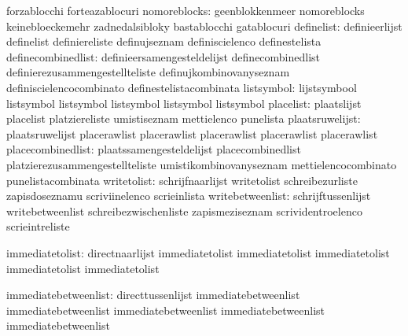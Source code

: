                                   forzablocchi                     forteazablocuri
                   nomoreblocks:  geenblokkenmeer                  nomoreblocks
                                  keinebloeckemehr                 zadnedalsibloky
                                  bastablocchi                     gatablocuri
                     definelist:  definieerlijst                   definelist
                                  definiereliste                   definujseznam
                                  definiscielenco                  definestelista
             definecombinedlist:  definieersamengesteldelijst      definecombinedlist
                                  definierezusammengestellteliste  definujkombinovanyseznam
                                  definiscielencocombinato         definestelistacombinata
listsymbol: lijstsymbool listsymbol
            listsymbol   listsymbol
            listsymbol   listsymbol
                      placelist:  plaatslijst                      placelist
                                  platziereliste                   umistiseznam
                                  mettielenco                      punelista
                plaatsruwelijst:  plaatsruwelijst                  placerawlist
                                  placerawlist                     placerawlist
                                  placerawlist                     placerawlist
              placecombinedlist:  plaatssamengesteldelijst         placecombinedlist
                                  platzierezusammengestellteliste  umistikombinovanyseznam
                                  mettielencocombinato             punelistacombinata
                    writetolist:  schrijfnaarlijst                 writetolist
                                  schreibezurliste                 zapisdoseznamu
                                  scriviinelenco                   scrieinlista
               writebetweenlist:  schrijftussenlijst               writebetweenlist
                                  schreibezwischenliste            zapismeziseznam
                                  scrividentroelenco               scrieintreliste


                 immediatetolist: directnaarlijst                  immediatetolist
                                  immediatetolist                  immediatetolist
                                  immediatetolist                  immediatetolist

            immediatebetweenlist: directtussenlijst                immediatebetweenlist
                                  immediatebetweenlist             immediatebetweenlist
                                  immediatebetweenlist             immediatebetweenlist

